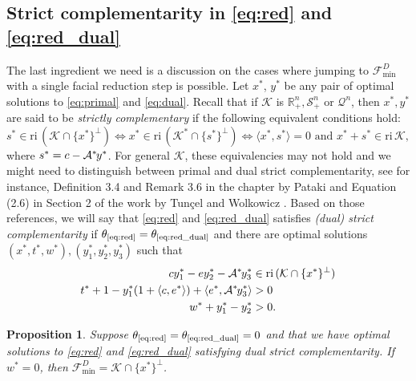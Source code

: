 \documentclass{article}
\newcommand{\SOC}[1]{{\mathcal{Q}^{#1}}}
\newcommand{\reInt}{\mathrm{ri}\,}
\newcommand{\inProd}[2]{\langle #1 , #2 \rangle }
\newcommand{\PSDcone}[1]{{\mathcal{S}^{#1}_+}}
\newcommand{\minFaceD}{ {\mathcal{F}_{\min}^D}}
\newcommand{\minFace}[1]{ {\mathcal{F}_{\min}^{#1}}}
\newcommand{\stdMap}{ {\mathcal{A}}}
\newcommand{\stdCone}{ {\mathcal{K}}}
\newcommand{\stdInt}{ {e}}
\newcommand{\opt}[1]{ {\theta _{#1}}}
\renewcommand{\Re}{\mathbb{R}}
\newcommand{\T}{\ast\hspace{-1pt}}
\newtheorem{proposition}[definition]{Proposition}
\begin{document}
\subsection{Strict complementarity in \eqref{eq:red} and \eqref{eq:red_dual}}\label{sec:compl}
The last ingredient we need is a discussion on the cases where 
jumping to $\minFaceD$ with a single facial reduction step is possible. 
Let $x^*$, $y^*$ be any pair of optimal solutions to \eqref{eq:primal} and \eqref{eq:dual}. Recall that if $\stdCone$ is $\Re^n_+,\PSDcone{n}$ or 
$\SOC{n}$, then $x^*,y^*$ are said to be \emph{strictly complementary} if 
the following equivalent conditions hold:
$$
s^* \in \reInt (\stdCone \cap \{x^*\}^\perp) \Leftrightarrow x^* \in \reInt (\stdCone^* \cap \{s^*\}^\perp) \Leftrightarrow \inProd{x^*}{s^*} = 0 \text{ and } x^* + s^* \in \reInt \stdCone,
$$
where $s^* = c - \stdMap ^\T y^*$.
For general $\stdCone$, these equivalencies may not hold and we might need 
to distinguish between primal and dual strict complementarity, see 
for instance, Definition 3.4 and Remark 3.6 in the chapter by Pataki \cite{pataki_handbook} and Equation (2.6) in Section 2 of the work by Tun\c{c}el and Wolkowicz \cite{TW12}. 
Based on those references, we will say 
that \eqref{eq:red} and \eqref{eq:red_dual}  satisfies  
\emph{(dual) strict complementarity} if $\opt{\text{\ref{eq:red}}} = \opt{\text{\ref{eq:red_dual}}}$
and there are optimal solutions $(x^*, t^*,w^*), (y_1^*,y_2^*,y_3^*)$ such that
 \begin{align}
 cy_1^* -\stdInt y_2^* -\stdMap^\T y_3^* &\in \reInt (\stdCone \cap\{ x^*\}^\perp)  \label{eq:strict1}\\
 t^* +  1-y_1^*(1+\inProd{c}{\stdInt^*}) + \inProd{\stdInt^* }{\stdMap ^\T y_3^*}&> 0  \label{eq:strict2}\\
 w^* + y_1^*-y_2^* & > 0. \label{eq:strict3} 
 \end{align}
 \vspace{-1\baselineskip}
\begin{proposition}\label{prop:strict}
Suppose $\opt{\text{\ref{eq:red}}} = \opt{\text{\ref{eq:red_dual}}} = 0$  and that  we have  optimal solutions to \eqref{eq:red} and 
\eqref{eq:red_dual} satisfying dual strict complementarity. 
If $w^* = 0$, then $\minFaceD = \stdCone \cap\{ x^*\}^\perp$.
\end{proposition}
\end{document}
